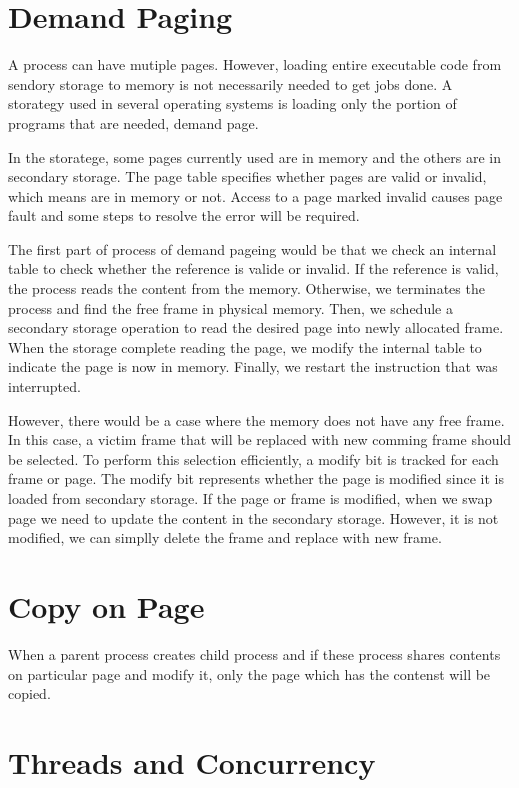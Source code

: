 \section{Demand Paging}
\label{sec:history}
A process can have mutiple pages. However, loading entire executable code from sendory storage to memory is not necessarily needed to 
get jobs done. A storategy used in several operating systems is loading only the portion of programs that are needed, demand page. 

In the storatege, some pages currently used are in memory and the others are in secondary storage. 
The page table specifies whether pages are valid or invalid, which means are in memory or not. 
Access to a page marked invalid causes page fault and some steps to resolve the error will be required. 

The first part of process of demand pageing would be that we check an internal table to check whether the reference is valide or invalid.
If the reference is valid, the process reads the content from the memory. Otherwise, we terminates the process and find the free frame in 
physical memory. Then, we schedule a secondary storage operation to read the desired page into newly allocated frame. 
When the storage complete reading the page, we modify the internal table to indicate the page is now in memory. 
Finally, we restart the instruction that was interrupted. 

However, there would be a case where the memory does not have any free frame. In this case, a victim frame that will be replaced with new comming frame should be selected. 
To perform this selection efficiently, a modify bit is tracked for each frame or page. The modify bit represents whether the page is modified since it is loaded from secondary storage. 
If the page or frame is modified, when we swap page we need to update the content in the secondary storage. However, it is not modified, we can simplly delete the frame and replace with new frame.



\section{Copy on Page}
\label{sec:history}
When a parent process creates child process and if these process shares contents on particular page and modify it, 
only the page which has the contenst will be copied.


\section{Threads and Concurrency}
\label{sec:history}
